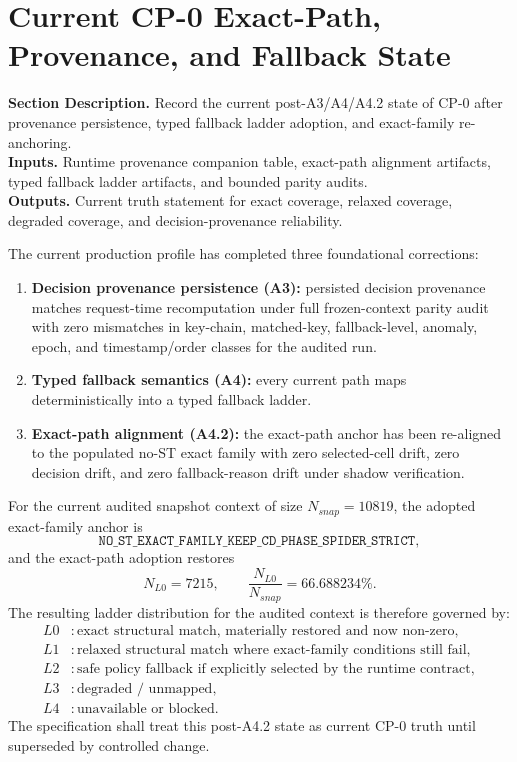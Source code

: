 \documentclass[11pt]{report}
\newcommand{\meta}[3]{\textbf{Section Description.} #1\\
\textbf{Inputs.} #2\\
\textbf{Outputs.} #3\par}
\begin{document}
\section{Current CP-0 Exact-Path, Provenance, and Fallback State}
\meta{Record the current post-A3/A4/A4.2 state of CP-0 after provenance persistence, typed fallback ladder adoption, and exact-family re-anchoring.}{Runtime provenance companion table, exact-path alignment artifacts, typed fallback ladder artifacts, and bounded parity audits.}{Current truth statement for exact coverage, relaxed coverage, degraded coverage, and decision-provenance reliability.}

The current production profile has completed three foundational corrections:
\begin{enumerate}[leftmargin=1.2cm]
    \item \textbf{Decision provenance persistence (A3):} persisted decision provenance matches request-time recomputation under full frozen-context parity audit with zero mismatches in key-chain, matched-key, fallback-level, anomaly, epoch, and timestamp/order classes for the audited run.
    \item \textbf{Typed fallback semantics (A4):} every current path maps deterministically into a typed fallback ladder.
    \item \textbf{Exact-path alignment (A4.2):} the exact-path anchor has been re-aligned to the populated no-ST exact family with zero selected-cell drift, zero decision drift, and zero fallback-reason drift under shadow verification.
\end{enumerate}

For the current audited snapshot context of size $N_{snap}=10819$, the adopted exact-family anchor is
\[
\texttt{NO\_ST\_EXACT\_FAMILY\_KEEP\_CD\_PHASE\_SPIDER\_STRICT},
\]
and the exact-path adoption restores
\[
N_{L0}=7215,
\qquad
\frac{N_{L0}}{N_{snap}}=66.688234\%.
\]
The resulting ladder distribution for the audited context is therefore governed by:
\begin{align*}
L0 &: \text{exact structural match, materially restored and now non-zero},\\
L1 &: \text{relaxed structural match where exact-family conditions still fail},\\
L2 &: \text{safe policy fallback if explicitly selected by the runtime contract},\\
L3 &: \text{degraded / unmapped},\\
L4 &: \text{unavailable or blocked}.
\end{align*}
The specification shall treat this post-A4.2 state as current CP-0 truth until superseded by controlled change.
\end{document}
